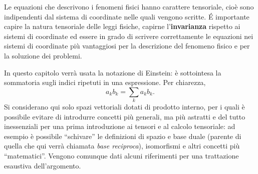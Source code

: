 

Le equazioni che descrivono i fenomeni fisici hanno carattere tensoriale,
 cioè sono indipendenti dal sistema di coordinate nelle quali vengono scritte.
\'E importante capire la natura tensoriale delle leggi fisiche, capirne
 l'\textbf{invarianza} rispetto ai sistemi di coordinate ed essere in grado di
 scrivere correttamente le equazioni nei sistemi di coordinate più vantaggiosi
 per la descrizione del fenomeno fisico e per la soluzione dei problemi.

\vspace{0.2cm}
\noindent
In questo capitolo verrà usata la notazione di Einstein: è sottointesa la sommatoria
 sugli indici ripetuti in una espressione. Per chiarezza,
\begin{equation}
 a_k b_k = \displaystyle\sum_k a_k b_k .
\end{equation}
%
Si considerano qui solo spazi vettoriali dotati di 
 prodotto interno, per i quali è possibile evitare di introdurre concetti
 più generali, ma più astratti e del tutto inessenziali per una prima
 introduzione ai tensori e al calcolo tensoriale: ad esempio è possibile
 ``schivare'' le definizioni di spazio e base duale (parente di quella che qui
 verrà chiamata \textit{base reciproca}), isomorfismi e altri concetti più
 ``matematici''. Vengono comunque dati alcuni riferimenti per una trattazione esaustiva
 dell'argomento. 

\noindent

